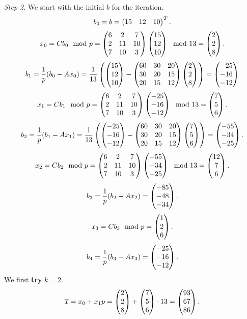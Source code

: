 \documentclass[12pt]{article}
\theoremstyle{plain}
\begin{document}
\emph{Step 2}. We start with the initial $b$ for the iteration.
$$b_0 = b = \m{15 & 12 & 10}^T.$$
$$x_0 = Cb_0 \mod p = \m{6 & 2 & 7 \\ 2 & 11 & 10 \\ 7 & 10 & 3}\m{15 \\ 12 \\ 10}\mod 13 = \m{2\\2\\8}.$$
$$b_1 = \frac{1}{p}(b_0-Ax_0)= \frac{1}{13}\left(\m{15 \\ 12 \\ 10}-\m{60 & 30 & 20 \\
30 & 20 & 15 \\
20 & 15 & 12}\m{2\\2\\8}\right) = \m{-25\\-16\\-12}$$
$$x_1 = Cb_1 \mod p = \m{6 & 2 & 7 \\ 2 & 11 & 10 \\ 7 & 10 & 3}\m{-25 \\ -16 \\ -12}\mod 13 = \m{7\\5\\6}.$$
$$b_2 = \frac{1}{p}(b_1-Ax_1)= \frac{1}{13}\left(\m{-25\\-16\\-12}-\m{60 & 30 & 20 \\
30 & 20 & 15 \\
20 & 15 & 12}\m{7\\5\\6}\right) = \m{-55\\-34\\-25}.$$
$$x_2 = Cb_2 \mod p = \m{6 & 2 & 7 \\ 2 & 11 & 10 \\ 7 & 10 & 3}\m{-55\\-34\\-25} \mod 13 = \m{12\\7\\6}.$$
$$b_3 = \frac{1}{p}(b_2-Ax_2)= \m{-85\\-48\\-34}.$$
$$x_3 = Cb_3 \mod p = \m{1\\2\\6}.$$
$$b_4 = \frac{1}{p}(b_3-Ax_3) = \m{-25\\-16\\-12}.$$
We first {\bf try} $k=2$.
$$\overline{x} = x_0 + x_1 p = \m{2\\2\\8} + \m{7\\5\\6} \cdot 13 = \m{93\\67\\86}.$$
\end{document}
